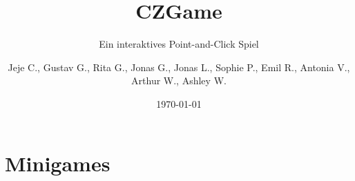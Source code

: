 \documentclass{beamer} [10.12.2024]
\title{CZGame}
\subtitle{Ein interaktives Point-and-Click Spiel}
\author{Jeje C., Gustav G., Rita G., Jonas G., Jonas L., Sophie P., Emil R., Antonia V., Arthur W., Ashley W.}
\institute[CZG]{Carl-Zeiss-Gymnasium Jena}
\date{\today}
\begin{document}
	
	\section{Minigames}
	
\end{document}
